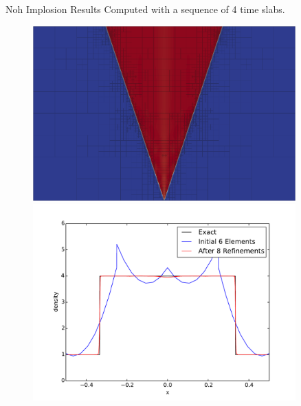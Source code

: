 \documentclass[final]{beamer}
\newlength{\sepwid}
\newlength{\onecolwid}
\begin{document}
\begin{frame}[t]
\begin{columns}[t]
\begin{column}{\onecolwid}
\begin{block}{Noh Implosion Results}
Computed with a sequence of 4 time slabs.
\begin{figure}
\includegraphics[width=0.8\linewidth]{Noh/MinNSDecoupled/mesh9.png}\\
\includegraphics[width=0.8\linewidth]{figs/NohComparison.pdf}\\
\end{figure}
\end{block}


\end{column} %

\begin{column}{\sepwid}\end{column} %

\begin{column}{\onecolwid} %




\end{column}
\end{columns}
\end{frame}
\end{document}
